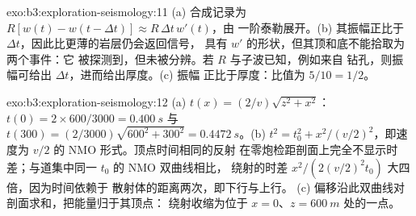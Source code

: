 \begin{solution}{exo:b3:exploration-seismology:11}
(a) 合成记录为 $R[w(t) - w(t - \Delta t)] \approx R\,\Delta t\,w'(t)$，由
一阶泰勒展开。(b) 其振幅正比于
$\Delta t$，因此比更薄的岩层仍会返回信号，
具有 $w'$ 的形状，但其顶和底不能拾取为两个事件：它
被探测到，但未被分辨。若 $R$ 与子波已知，例如来自
钻孔，则振幅可给出 $\Delta t$，进而给出厚度。(c) 振幅
正比于厚度：比值为 $5/10 = 1/2$。
\end{solution}

\begin{solution}{exo:b3:exploration-seismology:12}
(a) $t(x) = (2/v)\sqrt{z^2 + x^2}$：$t(0) = 2\times600/3000 = \qty{0.400}{s}$ 与
$t(300) = (2/3000)\sqrt{600^2 + 300^2} = \qty{0.4472}{s}$。(b) $t^2 = t_0^2 +
x^2/(v/2)^2$，即速度为 $v/2$ 的 NMO 形式。顶点时间相同的反射
在零炮检距剖面上完全不显示时差；与道集中同一 $t_0$ 的 NMO 双曲线相比，
绕射的时差
$x^2/(2(v/2)^2t_0)$ 大四倍，因为时间依赖于
散射体的距离两次，即下行与上行。
(c) 偏移沿此双曲线对剖面求和，把能量归于其顶点：
绕射收缩为位于 $x = 0$、$z = \qty{600}{m}$ 处的一点。
\end{solution}

